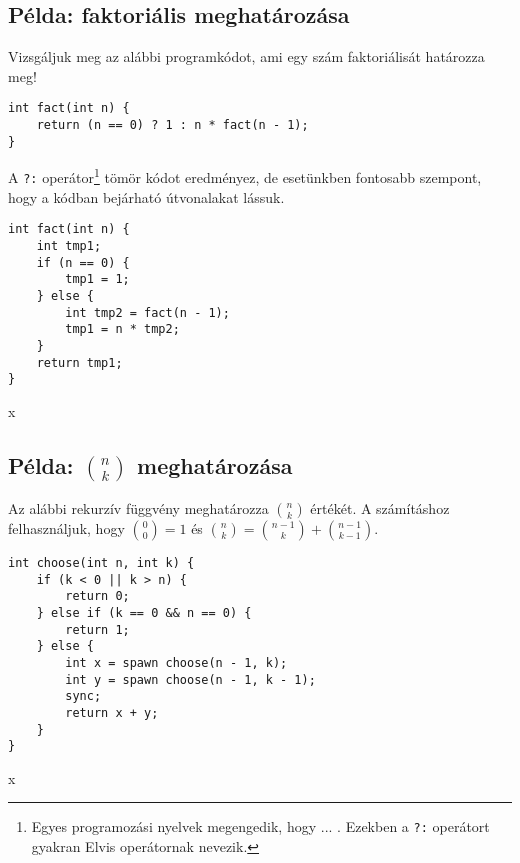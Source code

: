 
\subsection{Példa: faktoriális meghatározása}

Vizsgáljuk meg az alábbi programkódot, ami egy szám faktoriálisát határozza meg!

\begin{lstlisting}
int fact(int n) {
	return (n == 0) ? 1 : n * fact(n - 1);
}
\end{lstlisting}

A \lstinline{?:} operátor\footnote{Egyes programozási nyelvek megengedik, hogy ... . Ezekben a \lstinline{?:} operátort gyakran Elvis operátornak nevezik.} tömör kódot eredményez, de esetünkben fontosabb szempont, hogy a kódban bejárható útvonalakat lássuk.

\begin{minipage}{0.5\linewidth}
\begin{lstlisting}
int fact(int n) {
	int tmp1;
	if (n == 0) {
		tmp1 = 1;
	} else {
		int tmp2 = fact(n - 1);
		tmp1 = n * tmp2;
	}
	return tmp1;
}
\end{lstlisting}
\end{minipage}
\begin{minipage}{0.5\linewidth}
	x
\end{minipage}

\subsection{Példa: $n \choose k$ meghatározása}

Az alábbi rekurzív függvény meghatározza $n \choose k$ értékét. A számításhoz felhasználjuk, hogy ${0 \choose 0} = 1$ és ${n \choose k} = {n-1 \choose k} + {n-1 \choose k-1}$.


\begin{minipage}{0.5\linewidth}
\begin{lstlisting}
int choose(int n, int k) {
	if (k < 0 || k > n) {
		return 0;
	} else if (k == 0 && n == 0) {
		return 1;
	} else {
		int x = spawn choose(n - 1, k);
		int y = spawn choose(n - 1, k - 1);
		sync;
		return x + y;
	}
}
\end{lstlisting}
\end{minipage}
\begin{minipage}{0.5\linewidth}
	x
\end{minipage}



